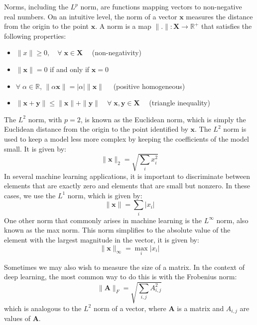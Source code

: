 \documentclass[12pt]{report}
\numberwithin{equation}{section}
\begin{document}
Norms, including the $L^p$ norm, are functions mapping vectors to non-negative real numbers. On an intuitive level, the norm of a vector $\bm{x}$ measures the distance from the origin to the point $\bm{x}$. A norm is a map $\|.\|:\bm{X}\rightarrow \mathbb{R}^+$ that satisfies the following properties:
\begin{itemize}
\item $\|x\| \geq 0, \quad \forall\;\bm{x}\in\bm{X} \quad$ (non-negativity)
\item $\|\bm{x}\| = 0$ if and only if $\bm{x}=0$
\item $\forall\; \alpha\in \mathbb{R}$, $\|\alpha \bm{x}\| = |\alpha|\|\bm{x}\|\quad$ (positive homogeneous)
\item $\|\bm{x}+\bm{y}\| \leq \|\bm{x}\| + \|\bm{y}\| \quad \forall\; \bm{x},\bm{y}\in\bm{X}\quad$ (triangle inequality)
\end{itemize}
The $L^2$ norm, with $p = 2$, is known as the {Euclidean norm}, which is simply the Euclidean distance from the origin to the point identified by $\bm{x}$. The $L^2$ norm is used to keep a model less more complex by keeping the coefficients of the model small. It is given by:
\begin{equation}\label{eqn:l2-norm}
\|\bm{x}\|_2 = \sqrt{\sum_i x_i^2}
\end{equation} 
In several machine learning applications, it is important to discriminate between elements that are exactly zero and elements that are small but nonzero. In these cases, we use the $L^1$ norm, which is given by:
\begin{equation}\label{eqn:l1-norm}
\|\bm{x}\| = \sum_i |x_i|
\end{equation}
One other norm that commonly arises in machine learning is the $L^\infty$ norm, also known as the {max norm}. This norm simplifies to the absolute value of the element with the largest magnitude in the vector, it is given by:
\begin{equation}\label{eqn:max-norm}
\|\bm{x}\|_\infty = \max_i |x_i|
\end{equation}

Sometimes we may also wish to measure the size of a matrix. In the context
of deep learning, the most common way to do this is with the {Frobenius norm}:
\begin{equation}\label{eqn:fro-norm}
\|\bm{A}\|_F = \sqrt{\sum_{i,j} A_{i,j}^2}
\end{equation} 
which is analogous to the $L^2$ norm of a vector, where $\bm{A}$ is a matrix and $A_{i,j}$ are values of $\bm{A}$.
\end{document}
